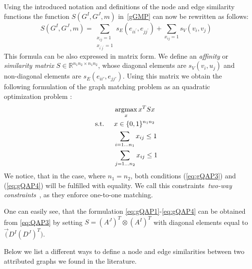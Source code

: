 Using the introduced notation and definitions of the node and edge similarity functions the function $S(G^I,G^J,m)$ in~\eqref{gGMP} can now be rewritten as follows:
\begin{equation}\label{eq:sumQAP}
	S(G^I,G^J,m)=\sum_{\substack{x_{ij}=1\\x_{i^\prime j^\prime}=1}}s_E(e_{ii^\prime},e_{jj^\prime}) + \sum_{x_{ij}=1}s_V(v_{i},v_{j})
\end{equation}
This formula can be also expressed in matrix form. We define an \emph{affinity} or \emph{similarity matrix} $S\in\mathbb{R}^{n_1n_2\times n_1n_2}$, whose diagonal elements are $s_V(v_i, u_j)$ and non-diagonal elements are $s_E(e_{ii\prime}, e_{jj\prime})$. Using this matrix we obtain the following formulation of the graph matching problem as an quadratic optimization problem \cite{Cho2014_Haystack, Cho2010_RRWM, Cho2012_ProgressiveGM, Conte2004,Rangarajan1996_GAGM,Leordeanu2005_SM,Leordeanu2009_IPFP}:
\begin{alignat}{2}
    &     && \argmax_x{x^TSx}                           \label{eq:gQAP1}\\ %
    & \text{s.t. } &&  x\in \{0,1\}^{n_1n_2}            \label{eq:gQAP2}\\
    &             &&  \sum_{i=1\dots n_1} x_{ij}\le 1    \label{eq:gQAP3}\\
    &             &&  \sum_{j=1\dots n_2} x_{ij}\le 1    \label{eq:gQAP4}
\end{alignat}
We notice, that in the case, where $n_1=n_2$, both conditions (\ref{eq:gQAP3}) and (\ref{eq:gQAP4}) will be fulfilled with equality. We call this constraints~\emph{two-way constraints}~\cite{Rangarajan1996_GAGM}, as they enforce one-to-one matching.

One can easily see, that the formulation \eqref{eq:gQAP1}-\eqref{eq:gQAP4} can be obtained from \eqref{eq:QAP3} by setting $S=(A^J)^T\otimes(A^I)^T$ with diagonal elements equal to $\vec(D^I(D^J)^T)$.

Below we list a different ways to define a node and edge similarities between two attributed graphs we found in the literature.

